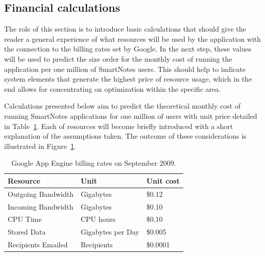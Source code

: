 \subsection{Financial calculations}\label{subsec:gae_calculations}
The role of this section is to introduce basic calculations that should give the reader a general experience of what resources will be used by the application with the connection to the billing rates set by Google. In the next step, these values will be used to predict the size order for the monthly cost of running the application per one million of SmartNotes users. This should help to indicate system elements that generate the highest price of resource usage, which in the end allows for concentrating on optimization within the specific area.
 
Calculations presented below aim to predict the theoretical monthly cost of running SmartNotes applications for one million of users with unit price detailed in Table~\ref{tab:gae_cost}. Each of resources will become briefly introduced with a short explanation of the assumptions taken. The outcome of these considerations is illustrated in Figure~\ref{tab:gae_cost}.
\begin{table}[h]
\centering
\caption{Google App Engine billing rates on September 2009.}
\label{tab:gae_cost}
\begin{tabular}{|l|l|l|} \hline \hline
\textbf{Resource} & \textbf{Unit} & \textbf{Unit cost} \\ \hline \hline
Outgoing Bandwidth & Gigabytes & \$0.12 \\ \hline
Incoming Bandwidth & Gigabytes & \$0.10 \\ \hline
CPU Time & CPU hours & \$0.10 \\ \hline
Stored Data & Gigabytes per Day & \$0.005 \\ \hline
Recipients Emailed & Recipients & \$0.0001\\ \hline \hline
\end{tabular}
\end{table}
 
